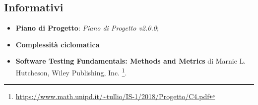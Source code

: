 \subsection{Informativi}\label{rfinf}
\begin{itemize}
	\item \textbf{Piano di Progetto}: \textit{Piano di Progetto v2.0.0};
	\item \textbf{Complessità ciclomatica}
	\item \textbf{Software Testing Fundamentals: Methods and Metrics} di Marnie L. Hutcheson, Wiley Publishing, Inc.  
	\footnote{\url{https://www.math.unipd.it/~tullio/IS-1/2018/Progetto/C4.pdf}}.
\end{itemize}
